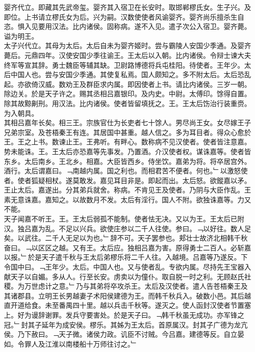 \documentclass{zhvt-classic}
\begin{document}
\hspace*{2em}婴齐代立。即藏其先武帝玺。婴齐其入宿卫在长安时。取邯郸樛氏女。生子兴。及即位。上书请立樛氏女为后。兴为嗣。汉数使使者风谕婴齐。婴齐尚乐擅杀生自恣。惧入见要用汉法。比内诸侯。固称病。遂不入见。遣子次公入宿卫。婴齐薨。谥为明王。\\
\hspace*{2em}太子兴代立。其母为太后。太后自未为婴齐姬时。尝与霸陵人安国少季通。及婴齐薨后。元鼎四年。汉使安国少季往谕王。王太后以入朝。比内诸侯。令辩士谏大夫终军等宣其辞。勇士魏臣等辅其缺。卫尉路博德将兵屯桂阳。待使者。王年少。太后中国人也。尝与安国少季通。其使复私焉。国人颇知之。多不附太后。太后恐乱起。亦欲倚汉威。数劝王及群臣求内属。即因使者上书。请比内诸侯。三岁一朝。除边关。於是天子许之。赐其丞相吕嘉银印。及内史。中尉。太傅印。馀得自置。除其故黥劓刑。用汉法。比内诸侯。使者皆留填抚之。王。王太后饬治行装重赍。为入朝具。\\
\hspace*{2em}其相吕嘉年长矣。相三王。宗族官仕为长吏者七十馀人。男尽尚王女。女尽嫁王子兄弟宗室。及苍梧秦王有连。其居国中甚重。越人信之。多为耳目者。得众心愈於王。王之上书。数谏止王。王弗听。有畔心。数称病不见汉使者。使者皆注意嘉。势未能诛。王。王太后亦恐嘉等先事发。乃置酒。介汉使者权。谋诛嘉等。使者皆东乡。太后南乡。王北乡。相嘉。大臣皆西乡。侍坐饮。嘉弟为将。将卒居宫外。酒行。太后谓嘉曰。﹁南越内属。国之利也。而相君苦不便者。何也。﹂以激怒使者。使者狐疑相杖。遂莫敢发。嘉见耳目非是。即起而出。太后怒。欲鏦嘉以矛。王止太后。嘉遂出。分其弟兵就舍。称病。不肯见王及使者。乃阴与大臣作乱。王素无意诛嘉。嘉知之。以故数月不发。太后有淫行。国人不附。欲独诛嘉等。力又不能。\\
\hspace*{2em}天子闻嘉不听王。王。王太后弱孤不能制。使者怯无决。又以为王。王太后已附汉。独吕嘉为乱。不足以兴兵。欲使庄参以二千人往使。参曰。﹁以好往。数人足矣。以武往。二千人无足以为也。﹂辞不可。天子罢参也。郏壮士故济北相韩千秋奋曰。﹁以区区之越。又有王。太后应。独相吕嘉为害。原得勇士二百人。必斩嘉以报。﹂於是天子遣千秋与王太后弟樛乐将二千人往。入越境。吕嘉等乃遂反。下令国中曰。﹁王年少。太后。中国人也。又与使者乱。专欲内属。尽持先王宝器入献天子以自媚。多从人。行至长安。虏卖以为僮仆。取自脱一时之利。无顾赵氏社稷。为万世虑计之意。﹂乃与其弟将卒攻杀王。太后及汉使者。遣人告苍梧秦王及其诸郡县。立明王长男越妻子术阳侯建德为王。而韩千秋兵入。破数小邑。其后越直开道给食。未至番禺四十里。越以兵击千秋等。遂灭之。使人函封汉使者节置塞上。好为谩辞谢罪。发兵守要害处。於是天子曰。﹁韩千秋虽无成功。亦军锋之冠。﹂封其子延年为成安侯。樛乐。其姊为王太后。首原属汉。封其子广德为龙亢侯。乃下赦曰。﹁天子微。诸侯力政。讥臣不讨贼。今吕嘉。建德等反。自立晏如。令罪人及江淮以南楼船十万师往讨之。﹂\\
\end{document}

